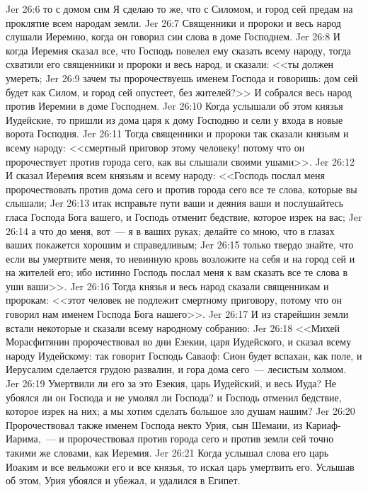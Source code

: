 \vs Jer 26:6 то с домом сим Я сделаю то же, что с Силомом, и город сей предам на проклятие всем народам земли.
\rsbpar\vs Jer 26:7 Священники и пророки и весь народ слушали Иеремию, когда он говорил сии слова в доме Господнем.
\vs Jer 26:8 И когда Иеремия сказал все, что Господь повелел ему сказать всему народу, тогда схватили его священники и пророки и весь народ, и сказали: <<ты должен умереть;
\vs Jer 26:9 зачем ты пророчествуешь именем Господа и говоришь: дом сей будет как Силом, и город сей опустеет,  без жителей?>> И собрался весь народ против Иеремии в доме Господнем.
\vs Jer 26:10 Когда услышали об этом князья Иудейские, то пришли из дома царя к дому Господню и сели у входа в новые ворота  Господня.
\vs Jer 26:11 Тогда священники и пророки так сказали князьям и всему народу: <<смертный приговор этому человеку! потому что он пророчествует против города сего, как вы слышали своими ушами>>.
\vs Jer 26:12 И сказал Иеремия всем князьям и всему народу: <<Господь послал меня пророчествовать против дома сего и против города сего все те слова, которые вы слышали;
\vs Jer 26:13 итак исправьте пути ваши и деяния ваши и послушайтесь гласа Господа Бога вашего, и Господь отменит бедствие, которое изрек на вас;
\vs Jer 26:14 а что до меня, вот~--- я в ваших руках; делайте со мною, что в глазах ваших покажется хорошим и справедливым;
\vs Jer 26:15 только твердо знайте, что если вы умертвите меня, то невинную кровь возложите на себя и на город сей и на жителей его; ибо истинно Господь послал меня к вам сказать все те слова в уши ваши>>.
\vs Jer 26:16 Тогда князья и весь народ сказали священникам и пророкам: <<этот человек не подлежит смертному приговору, потому что он говорил нам именем Господа Бога нашего>>.
\vs Jer 26:17 И из старейшин земли встали некоторые и сказали всему народному собранию:
\vs Jer 26:18 <<Михей Морасфитянин пророчествовал во дни Езекии, царя Иудейского, и сказал всему народу Иудейскому: так говорит Господь Саваоф: Сион будет вспахан, как поле, и Иерусалим сделается грудою развалин, и гора дома сего~--- лесистым холмом.
\vs Jer 26:19 Умертвили ли его за это Езекия, царь Иудейский, и весь Иуда? Не убоялся ли он Господа и не умолял ли Господа? и Господь отменил бедствие, которое изрек на них; а мы хотим сделать большое зло душам нашим?
\vs Jer 26:20 Пророчествовал также именем Господа некто Урия, сын Шемаии, из Кариаф-Иарима,~--- и пророчествовал против города сего и против земли сей точно такими же словами, как Иеремия.
\vs Jer 26:21 Когда услышал слова его царь Иоаким и все вельможи его и все князья, то искал царь умертвить его. Услышав об этом, Урия убоялся и убежал, и удалился в Египет.
